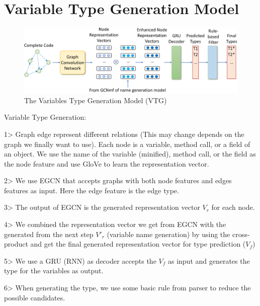 \section{Variable Type Generation Model}
\label{sec:type-gen}

\begin{figure}[ht]
	\begin{center}
	  \includegraphics[width=5.7in]{figures/type-gen-model}
          \vspace{-6pt}
		\caption{The Variables Type Generation Model (VTG)}
		\label{fig:type-gen}
	\end{center}
\end{figure}

Variable Type Generation:

1> Graph edge represent different relations (This may change depends on the graph we finally want to use). Each node is a variable, method call, or a field of an object. We use the name of the variable (minified), method call, or the field as the node feature and use GloVe to learn the representation vector.

2> We use EGCN that accepts graphs with both node features and edges features as input. Here the edge feature is the edge type. 

3> The output of EGCN is the generated representation vector $V_r$ for each node. 

4> We combined the representation vector we get from EGCN with the generated from the next step $V'_r$ (variable name generation) by using the cross-product and get the final generated representation vector for type prediction ($V_f$)

5> We use a GRU (RNN) as decoder accepts the $V_f$ as input and generates the type for the variables as output.

6> When generating the type, we use some basic rule from parser to reduce the possible candidates.
